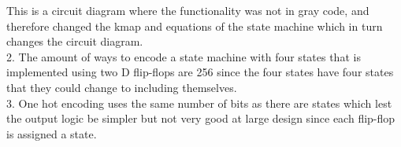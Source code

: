 \documentclass[CMPE]{KGCOEReport}
\begin{document}
This is a circuit diagram where the functionality was not in gray code, and therefore changed the kmap and equations of the state machine which in turn changes the circuit diagram.\\

2. The amount of ways to encode a state machine with four states that is implemented using two D flip-flops are 256 since the four states have four states that they could change to including themselves.\\

3. One hot encoding uses the same number of bits as there are states which lest the output logic be simpler but not very good at large design since each flip-flop is assigned a state.\\
\end{document}
